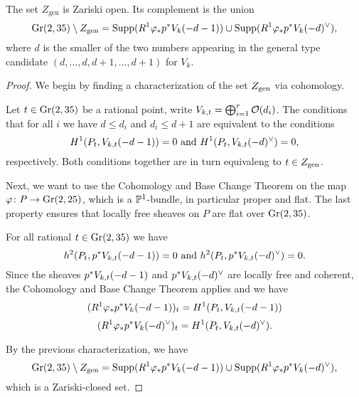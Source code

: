 



\begin{proposition}
	The set $Z_{\text{gen}}$ is Zariski open. Its complement is the union
	\[
		\operatorname{Gr}(2,35) \setminus Z_{\text{gen}} =
		\operatorname{Supp}(R^1 \varphi_{*}p^{*} V_{k}(-d-1)) \cup
		\operatorname{Supp}(R^1 \varphi_{*}p^{*} V_{k}(-d)^\vee),
	\]
	where $d$ is the smaller of the two numbers appearing in the general type candidate $(d,\dotsc,d,d+1,\dotsc,d+1)$ for $V_k$.
\end{proposition}
\begin{proof}
	We begin by finding a characterization of the set $Z_{\text{gen}}$ via cohomology.

	Let $t\in \operatorname{Gr}(2,35)$ be a rational point, write $V_{k,t}=\bigoplus_{i=1}^r \mathcal{O}(d_i)$. The conditions that for all $i$ we have $d\leq d_i$ and $d_i \leq d+1$ are equivalent to the conditions
	\[H^1(P_t, V_{k,t}(-d-1))=0
	\text{ and }
	H^1(P_t, V_{k,t}(-d)^\vee)=0,\] respectively. Both conditions together are in turn equivaleng to $t\in Z_{\text{gen}}$.

	Next, we want to use the Cohomology and Base Change Theorem \cite[{}28.1.6]{vakil-algebraic-geometry} on the map 
	$\varphi \colon P \to \operatorname{Gr}(2,25)$, which is a $\mathbb{P}^1$-bundle, in particular proper and flat. The last property ensures that locally free sheaves on $P$ are flat over $\operatorname{Gr}(2,35)$.

	For all rational $t\in \operatorname{Gr}(2,35)$ we have
	\[h^2(P_t, p^{*}V_{k,t}(-d-1)) = 0
	\text{ and }
	h^2(P_t,p^{*}V_{k,t}(-d)^\vee)=0.\]
	Since the sheaves $p^{*}V_{k,t}(-d-1)$ and $p^{*}V_{k,t}(-d)^\vee$ are locally free and coherent, the Cohomology and Base Change Theorem applies and we have 
	\[(R^1 \varphi_{*}p^{*} V_{k}(-d-1))_t = H^1(P_t,V_{k,t}(-d-1))\]
	\[
	(R^1 \varphi_{*}p^{*} V_{k}(-d)^\vee)_t = H^1(P_t,V_{k,t}(-d)^\vee).
	\]

	By the previous characterization, we have
	\[
		\operatorname{Gr}(2,35) \setminus Z_{\text{gen}} =
		\operatorname{Supp}(R^1 \varphi_{*}p^{*} V_{k}(-d-1)) \cup
		\operatorname{Supp}(R^1 \varphi_{*}p^{*} V_{k}(-d)^\vee),
	\]
	which is a Zariski-closed set.
\end{proof}

